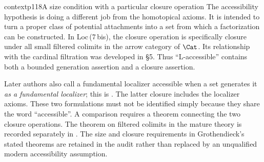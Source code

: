 \begin{dcomment}{context}{p118}{A size condition with a particular closure operation}
The accessibility hypothesis is doing a different job from the homotopical axioms. It is intended to turn a proper class of potential attachments into a set from which a factorization can be constructed. In Loc\,(7\,bis), the closure operation is specifically closure under all small filtered colimits in the arrow category of $\Cat$. Its relationship with the cardinal filtration was developed in \S5. Thus ``L-accessible'' contains both a bounded generation assertion and a closure assertion.

Later authors also call a fundamental localizer accessible when a set generates it \emph{as a fundamental localizer}; this is \citet[Definition 4.2.10]{Cisinski2006}. The latter closure includes the localizer axioms. These two formulations must not be identified simply because they share the word ``accessible''. A comparison requires a theorem connecting the two closure operations. The theorem on filtered colimits in the mature theory is recorded separately in \citet[Proposition 2.4.12 and Corollary 2.4.14]{Maltsiniotis2020}. The size and closure requirements in Grothendieck's stated theorems are retained in the audit rather than replaced by an unqualified modern accessibility assumption.
\end{dcomment}

